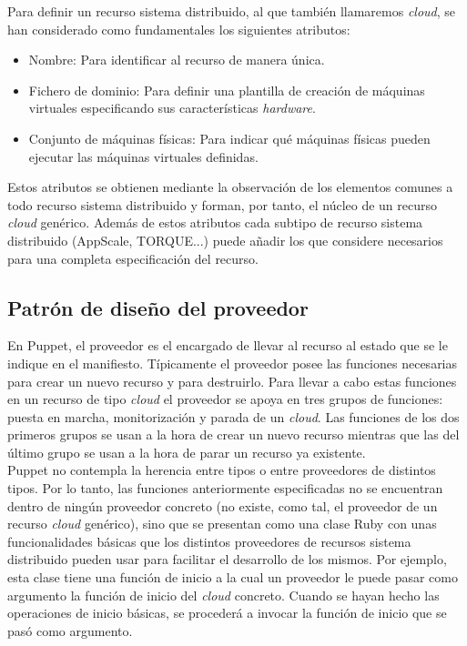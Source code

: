 Para definir un recurso sistema distribuido, al que también llamaremos \emph{cloud}, se han considerado como fundamentales los siguientes atributos:

\begin{itemize}
\item Nombre: Para identificar al recurso de manera única.
\item Fichero de dominio: Para definir una plantilla de creación de máquinas virtuales especificando sus características \emph{hardware}.
\item Conjunto de máquinas físicas: Para indicar qué máquinas físicas pueden ejecutar las máquinas virtuales definidas.
\end{itemize}

Estos atributos se obtienen mediante la observación de los elementos comunes a todo recurso sistema distribuido y forman, por tanto, el núcleo de un recurso \emph{cloud} genérico. Además de estos atributos cada subtipo de recurso sistema distribuido (AppScale, TORQUE...) puede añadir los que considere necesarios para una completa especificación del recurso.


\subsection{Patrón de diseño del proveedor}
\label{sec:modelado-proveedor}

En Puppet, el proveedor es el encargado de llevar al recurso al estado que se le indique en el manifiesto. Típicamente el proveedor posee las funciones necesarias para crear un nuevo recurso y para destruirlo. Para llevar a cabo estas funciones en un recurso de tipo \emph{cloud} el proveedor se apoya en tres grupos de funciones: puesta en marcha, monitorización y parada de un \emph{cloud}. Las funciones de los dos primeros grupos se usan a la hora de crear un nuevo recurso mientras que las del último grupo se usan a la hora de parar un recurso ya existente. \\

Puppet no contempla la herencia entre tipos o entre proveedores de distintos tipos. Por lo tanto, las funciones anteriormente especificadas no se encuentran dentro de ningún proveedor concreto (no existe, como tal, el proveedor de un recurso \emph{cloud} genérico), sino que se presentan como una clase Ruby con unas funcionalidades básicas que los distintos proveedores de recursos sistema distribuido pueden usar para facilitar el desarrollo de los mismos. Por ejemplo, esta clase tiene una función de inicio a la cual un proveedor le puede pasar como argumento la función de inicio del \emph{cloud} concreto. Cuando se hayan hecho las operaciones de inicio básicas, se procederá a invocar la función de inicio que se pasó como argumento. \\


